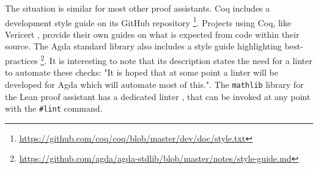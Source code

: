 The situation is similar for most other proof assistants. 
Coq \cite{barras:inria-00069968} includes
a development style guide on its GitHub repository \footnote{\url{https://github.com/coq/coq/blob/master/dev/doc/style.txt}}.
Projects using Coq, like Vericert \cite{herklotz2020formal},
provide their own guides on what is expected from
code within their source. The Agda \cite{agda} standard
library also includes a style guide highlighting best-practices
\footnote{\url{https://github.com/agda/agda-stdlib/blob/master/notes/style-guide.md}}. It is
interesting to note that its description states the
need for a linter to automate these checks: "It is hoped 
that at some point a linter will be developed for Agda which will 
automate most of this.". The \texttt{mathlib} library 
\cite{ThemathlibCommunity2020} for the Lean \cite{deMoura2015} proof 
assistant has a dedicated linter \cite{vanDoorn2020}, that can be
invoked at any point with the \texttt{\#lint} command.